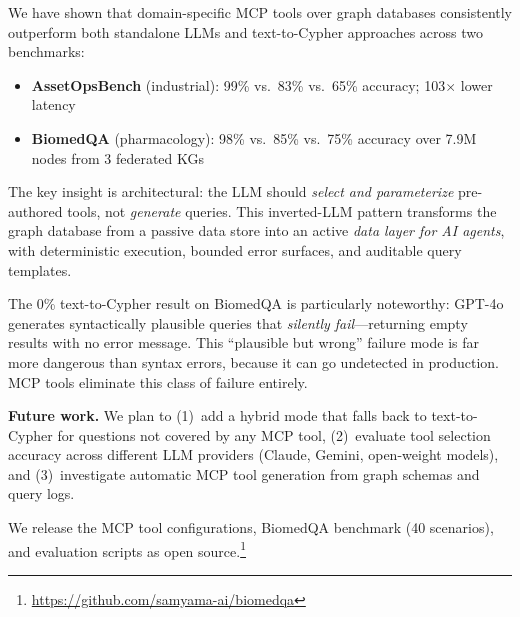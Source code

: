 \documentclass[sigconf]{acmart}
\begin{document}
We have shown that domain-specific MCP tools over graph databases
consistently outperform both standalone LLMs and text-to-Cypher
approaches across two benchmarks:

\begin{itemize}[leftmargin=*,nosep]
\item \textbf{AssetOpsBench} (industrial): 99\% vs.\ 83\% vs.\ 65\%
  accuracy; 103$\times$ lower latency
\item \textbf{BiomedQA} (pharmacology): 98\% vs.\ 85\% vs.\ 75\%
  accuracy over 7.9M nodes from 3 federated KGs
\end{itemize}

The key insight is architectural: the LLM should \emph{select and
parameterize} pre-authored tools, not \emph{generate} queries.
This inverted-LLM pattern transforms the graph database from a
passive data store into an active \emph{data layer for AI agents},
with deterministic execution, bounded error surfaces, and
auditable query templates.

The 0\% text-to-Cypher result on BiomedQA is particularly
noteworthy: GPT-4o generates syntactically plausible queries that
\emph{silently fail}---returning empty results with no error
message.  This ``plausible but wrong'' failure mode is far more
dangerous than syntax errors, because it can go undetected in
production.  MCP tools eliminate this class of failure entirely.

\smallskip\noindent\textbf{Future work.}
We plan to (1)~add a hybrid mode that falls back to text-to-Cypher
for questions not covered by any MCP tool, (2)~evaluate tool
selection accuracy across different LLM providers (Claude,
Gemini, open-weight models), and (3)~investigate automatic
MCP tool generation from graph schemas and query logs.

We release the MCP tool configurations, BiomedQA benchmark
(40 scenarios), and evaluation scripts as open
source.\footnote{\url{https://github.com/samyama-ai/biomedqa}}
\end{document}
